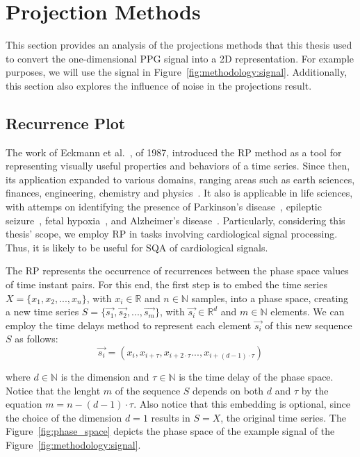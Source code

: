 



\section{Projection Methods}

This section provides an analysis of the projections methods that this thesis used to convert the one-dimensional \gls{PPG} signal into a 2D representation. For example purposes, we will use the signal in Figure~\ref{fig:methodology:signal}. Additionally, this section also explores the influence of noise in the projections result. 



\subsection{Recurrence Plot}

The work of Eckmann et al.~\cite{rp-1}, of 1987, introduced the \gls{RP} method as a tool for representing visually useful properties and behaviors of a time series. Since then, its application expanded to various domains, ranging areas such as earth sciences, finances, engineering, chemistry and physics~\cite{rp-2}. It also is applicable in life sciences, with attemps on identifying the presence of Parkinson's disease~\cite{rp-3}, epileptic seizure~\cite{rp-4}, fetal hypoxia~\cite{rp-5}, and Alzheimer's disease~\cite{rp-6}. Particularly, considering this thesis' scope, we employ \gls{RP} in tasks involving cardiological signal processing. Thus, it is likely to be useful for \gls{SQA} of cardiological signals.  

The \gls{RP} represents the occurrence of recurrences between the phase space values of time instant pairs. For this end, the first step is to embed the time series $X=\{x_1,x_2,...,x_n\}$, with $ x_i \in \mathbb{R}$ and $n \in \mathbb{N}$ samples, into a phase space, creating a new time series $S=\{\vec{s_1},\vec{s_2},...,\vec{s_m}\}$, with $ \vec{s_i} \in \mathbb{R}^d$ and $m \in \mathbb{N}$ elements. We can employ the time delays method to represent each element $\vec{s_i}$ of this new sequence $S$ as follows:
\begin{equation}
    \vec{s_i} = (x_i, x_{i + \tau}, x_{i + 2\cdot \tau} ..., x_{i + (d-1) \cdot \tau})
\end{equation}   

\noindent where $d \in \mathbb{N}$ is the dimension and $\tau \in \mathbb{N}$ is the time delay of the phase space. Notice that the lenght $m$ of the sequence $S$ depends on both $d$ and $\tau$ by the equation $m = n - (d-1) \cdot \tau$. Also notice that this embedding is optional, since the choice of the dimension $d=1$ results in $S=X$, the original time series. The Figure~\ref{fig:phase_space} depicts the phase space of the example signal of the Figure~\ref{fig:methodology:signal}.

